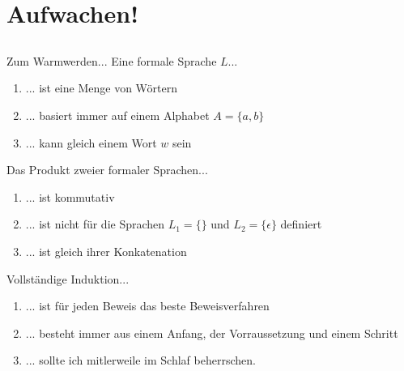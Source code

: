 \section[Einstieg]{Aufwachen!}
\subsection*{}
\begin{frame}{Zum Warmwerden...}
  Eine formale Sprache $L$...
    \begin{enumerate}
    \item { 
    ... ist eine Menge von Wörtern
    }
    \item { 
    ... basiert immer auf einem Alphabet $A=\{a,b \}$
    }
    \item { 
    ... kann gleich einem Wort $w$ sein
    }
    \end{enumerate}

  Das Produkt zweier formaler Sprachen...
    \begin{enumerate}
    \item { 
    ... ist kommutativ
    }
    \item { 
    ... ist nicht für die Sprachen $L_1=\{\}$ und $L_2=\{\epsilon\}$ definiert
    }
    \item { 
    ... ist gleich ihrer Konkatenation
    }
    \end{enumerate}

  Vollständige Induktion...
    \begin{enumerate}
    \item { 
    ... ist für jeden Beweis das beste Beweisverfahren
    }
    \item { 
    ... besteht immer aus einem Anfang, der Vorraussetzung und einem Schritt
    }
    \item { 
    ... sollte ich mitlerweile im Schlaf beherrschen.
    }
    \end{enumerate}
\end{frame}
